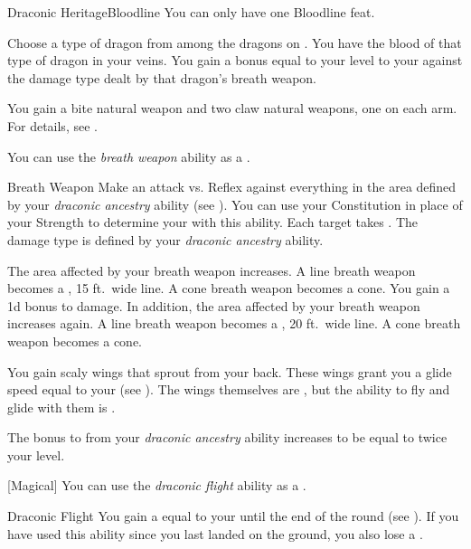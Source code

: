     \begin{feat}{Draconic Heritage}{Bloodline}
         You can only have one Bloodline feat.

         Choose a type of dragon from among the dragons on .
        You have the blood of that type of dragon in your veins.
        You gain a bonus equal to your level to your  against the damage type dealt by that dragon's breath weapon.

         You gain a bite natural weapon and two claw natural weapons, one on each arm.
        For details, see .

         You can use the \textit{breath weapon} ability as a .
        \begin{freeability}{Breath Weapon}
            Make an attack vs. Reflex against everything in the area defined by your \textit{draconic ancestry} ability (see ).
            You can use your Constitution in place of your Strength to determine your  with this ability.
            \hit Each target takes .
            The damage type is defined by your \textit{draconic ancestry} ability.

            \rankline
             The area affected by your breath weapon increases.
                A line breath weapon becomes a \areahuge, 15 ft.\ wide line.
                A cone breath weapon becomes a \arealarge cone.
             You gain a \plus1d bonus to damage.
                In addition, the area affected by your breath weapon increases again.
                A line breath weapon becomes a \areahuge, 20 ft.\ wide line.
                A cone breath weapon becomes a \areahuge cone.
        \end{freeability}

         You gain scaly wings that sprout from your back.
        These wings grant you a glide speed equal to your  (see ).
        The wings themselves are , but the ability to fly and glide with them is .

         The bonus to  from your \textit{draconic ancestry} ability increases to be equal to twice your level.

        [Magical] You can use the \textit{draconic flight} ability as a .
        \begin{freeability}{Draconic Flight}
            You gain a  equal to your  until the end of the round (see ).
            If you have used this ability since you last landed on the ground, you also lose a .
        \end{freeability}


\end{feat}
